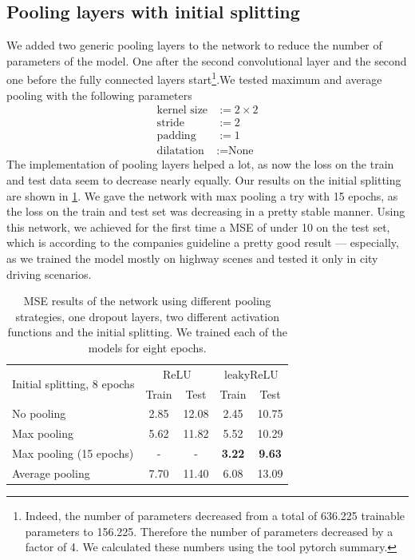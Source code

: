 \documentclass[conference]{IEEEtran}
\begin{document}
\subsection{Pooling layers with initial splitting}
We added two generic pooling layers to the network to reduce the number of parameters of the model. One after the second 
convolutional layer and the second one before the fully connected layers start\footnote{Indeed, the number of 
parameters decreased from a total of 636.225 trainable parameters to 156.225. Therefore the number of parameters decreased by a 
factor of 4. We calculated these numbers using the tool pytorch summary.}.We tested maximum and average pooling with the following 
parameters
\begin{align*}
\text{kernel size} &:= 2\times 2\\
\text{stride} &:= 2\\
\text{padding} &:= 1\\
\text{dilatation} &:= \text{None}
\end{align*}
The implementation of pooling layers helped a lot, as now the loss on the train and test data seem to decrease 
nearly equally. Our results on the initial splitting are shown in \cref{tab:ResultsInitialSplitting}. We gave the network
with max pooling a try with 15 epochs, as the loss on the train and test set was decreasing in a pretty stable manner. Using this
network, we achieved for the first time a MSE of under 10 on the test set, which is according to the companies guideline a pretty 
good result --- especially, as we trained the model mostly on highway scenes and tested it only in city driving scenarios.
\begin{table}[!t]
\normalsize
\centering
\begin{tabular}{lcccc}
\toprule
\multirow{2}{*}{Initial splitting, 8 epochs}  & \multicolumn{2}{c}{$\mathrm{ReLU}$} & \multicolumn{2}{c}{$\mathrm{leakyReLU}$} \\
 & Train & Test & Train & Test\\
\midrule
No pooling & 2.85 & 12.08 & 2.45 & 10.75 \\
Max pooling & 5.62 & 11.82 & 5.52 & 10.29 \\
Max pooling (15 epochs) & - & - & \textbf{3.22} & \textbf{9.63} \\
Average pooling & 7.70 & 11.40 & 6.08 & 13.09\\
\bottomrule
\end{tabular}
\caption{MSE results of the network using different pooling strategies, one dropout layers, two different activation functions and 
the initial splitting. We trained each of the models for eight epochs.}
\label{tab:ResultsInitialSplitting}
\end{table}
\end{document}

